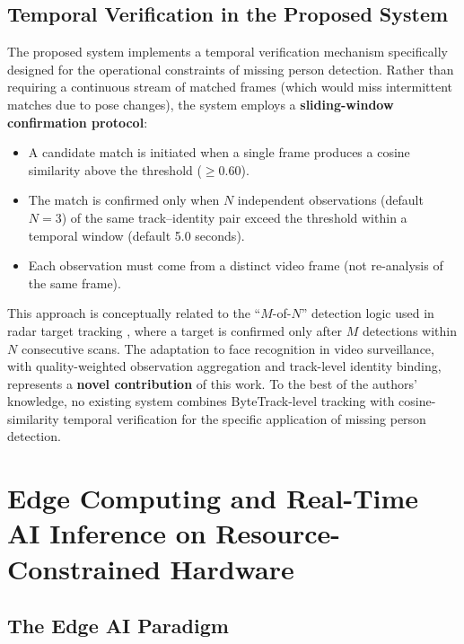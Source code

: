 \documentclass[12pt, a4paper]{article}
\begin{document}
\subsection{Temporal Verification in the Proposed System}

The proposed system implements a temporal verification mechanism specifically designed for the operational constraints of missing person detection. Rather than requiring a continuous stream of matched frames (which would miss intermittent matches due to pose changes), the system employs a \textbf{sliding-window confirmation protocol}:

\begin{itemize}[leftmargin=*]
    \item A candidate match is initiated when a single frame produces a cosine similarity above the threshold ($\geq 0.60$).
    \item The match is confirmed only when $N$ independent observations (default $N=3$) of the same track--identity pair exceed the threshold within a temporal window (default 5.0 seconds).
    \item Each observation must come from a distinct video frame (not re-analysis of the same frame).
\end{itemize}

This approach is conceptually related to the ``$M$-of-$N$'' detection logic used in radar target tracking \cite{barshalom2011}, where a target is confirmed only after $M$ detections within $N$ consecutive scans. The adaptation to face recognition in video surveillance, with quality-weighted observation aggregation and track-level identity binding, represents a \textbf{novel contribution} of this work. To the best of the authors' knowledge, no existing system combines ByteTrack-level tracking with cosine-similarity temporal verification for the specific application of missing person detection.


\section{Edge Computing and Real-Time AI Inference on Resource-Constrained Hardware}

\subsection{The Edge AI Paradigm}
\end{document}
